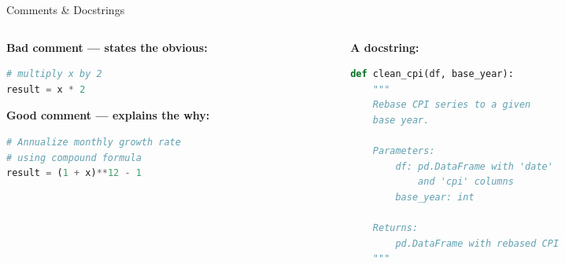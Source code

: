 \documentclass[13pt, aspectratio=169]{beamer}
\begin{document}
\begin{frame}[fragile]{Comments \& Docstrings}
    \begin{columns}
        \begin{column}{0.48\textwidth}
            \textbf{Bad comment — states the obvious:}
\begin{lstlisting}[language=python]
# multiply x by 2
result = x * 2
\end{lstlisting}
            \vspace{0.5em}
            \textbf{Good comment — explains the why:}
\begin{lstlisting}[language=python]
# Annualize monthly growth rate
# using compound formula
result = (1 + x)**12 - 1
\end{lstlisting}
        \end{column}
        \begin{column}{0.48\textwidth}
            \textbf{A docstring:}
\begin{lstlisting}[language=python]
def clean_cpi(df, base_year):
    """
    Rebase CPI series to a given
    base year.

    Parameters:
        df: pd.DataFrame with 'date'
            and 'cpi' columns
        base_year: int

    Returns:
        pd.DataFrame with rebased CPI
    """
\end{lstlisting}
        \end{column}
    \end{columns}
\end{frame}
\end{document}
